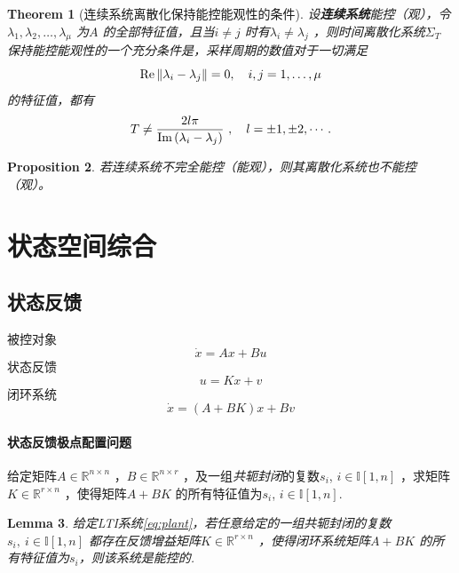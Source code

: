 \documentclass[14pt,a4paper]{article}
\theoremstyle{plain}
\newtheorem{thm}{Theorem}[section]
\theoremstyle{definition}
\theoremstyle{remark}
\theoremstyle{plain}
\newtheorem{lem}[thm]{Lemma}
\theoremstyle{plain}
\theoremstyle{plain}
\newtheorem{prop}[thm]{Proposition}
\theoremstyle{definition}
\theoremstyle{remark}
\numberwithin{equation}{section}
\begin{document}
				\begin{thm}[连续系统离散化保持能控能观性的条件]  
				\label{the:连续系统离散化保持能控能观性的条件}
					设\textbf{连续系统}能控（观），令$\lambda_1,\lambda_2,\ldots ,\lambda_{\mu}$ 为$A$ 的全部特征值，且当$i\neq j$ 时有$\lambda_{i}\neq \lambda_{j}$ ，则时间离散化系统$\Sigma_T$ 保持能控能观性的一个充分条件是，采样周期的数值对于一切满足
					\[
					\mathop{\textnormal{Re}} \|\lambda_{i}-\lambda_{j}\| = 0, \quad i,j=1,\ldots ,\mu 
					\]
					的特征值，都有
					\[
						T \neq \dfrac{2l\pi}{\mathop{\textnormal{Im}} \left( \lambda_{i}-\lambda_{j} \right) } \ ,\quad l = \pm 1, \pm 2, \cdots 
					.\] 
				\end{thm}

				\begin{prop}  
				\label{prop:88}
					若连续系统不完全能控（能观），则其离散化系统也不能控（观）。
				\end{prop} 

	\newpage
	\section{状态空间综合}%
	\label{sec:状态空间综合}
		
		\subsection{状态反馈}%
		\label{sub:状态反馈}

			\noindent 被控对象
			\begin{equation}
			\label{eq:plant}
				\dot x = Ax + Bu
			\end{equation} 
			状态反馈
			\begin{equation}
			\label{eq:statefeedback}
				u = Kx + v
			\end{equation} 
			闭环系统
			\begin{equation}
			\label{eq:closeloop}
			\dot x = (A+BK)x + Bv
			\end{equation} 
		
			\paragraph{状态反馈极点配置问题}%
			\label{par:状态反馈极点配置问题}
			
			给定矩阵$A\in \mathbb{R}^{n\times n}$ ，$B\in \mathbb{R}^{n\times r}$ ，及一组\emph{共轭封闭}的复数$s_{i}$, $i\in \mathbb{I}[1,n]$ ，求矩阵$K\in \mathbb{R}^{r\times n}$ ，使得矩阵$A+BK$ 的所有特征值为$s_{i}$, $i\in \mathbb{I}[1, n]$. 
			\begin{lem}  
			\label{lem:91}
			给定LTI系统\eqref{eq:plant}，若任意给定的一组共轭封闭的复数$s_{i},\ i\in \mathbb{I}[1,n]$ 都存在反馈增益矩阵$K\in \mathbb{R}^{r\times n}$ ，使得闭环系统矩阵$A+BK$ 的所有特征值为$s_{i}$，则该系统是能控的. 
			\end{lem} 
\end{document}
